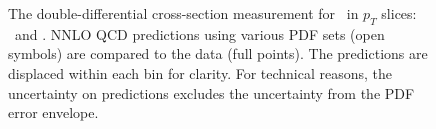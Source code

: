 \begin{figure}[phtb]
  \begin{center}
 \caption{ The double-differential cross-section measurement for \Wminusmunu\ in $p_T$ slices: \ptFive\ and \ptSix. NNLO QCD predictions using various PDF sets (open symbols) are compared to the data (full points). The predictions are displaced within each bin for clarity. For technical reasons, the uncertainty on predictions excludes the uncertainty from the PDF error envelope. }
 \label{fig:Comb:NNLO:W2dNEG_3}
 \end{center}
\end{figure}

